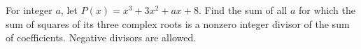 For integer $a$, let $P(x)=x^3+3x^2+ax+8$. Find the sum of all $a$ for which the sum of squares of its three complex roots is a nonzero integer divisor of the sum of coefficients. Negative divisors are allowed.
